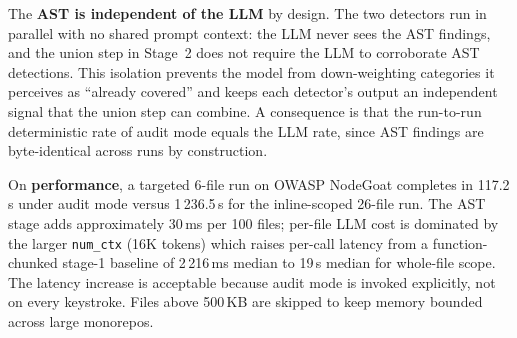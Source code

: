 The \textbf{AST is independent of the LLM} by design. The two detectors run in parallel with no shared prompt context: the LLM never sees the AST findings, and the union step in Stage~2 does not require the LLM to corroborate AST detections. This isolation prevents the model from down-weighting categories it perceives as ``already covered'' and keeps each detector's output an independent signal that the union step can combine. A consequence is that the run-to-run deterministic rate of audit mode equals the LLM rate, since AST findings are byte-identical across runs by construction.

On \textbf{performance}, a targeted 6-file run on OWASP NodeGoat completes in 117.2\,s under audit mode versus 1\,236.5\,s for the inline-scoped 26-file run. The AST stage adds approximately 30\,ms per 100 files; per-file LLM cost is dominated by the larger \texttt{num\_ctx} (16K tokens) which raises per-call latency from a function-chunked stage-1 baseline of 2\,216\,ms median to 19\,s median for whole-file scope. The latency increase is acceptable because audit mode is invoked explicitly, not on every keystroke. Files above 500\,KB are skipped to keep memory bounded across large monorepos.
